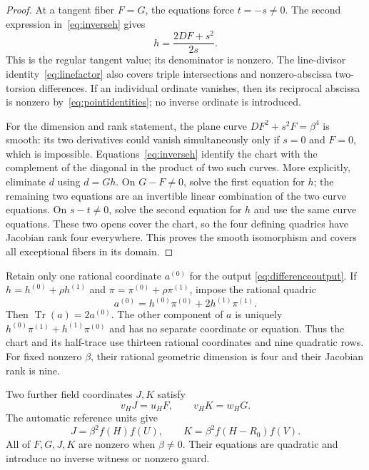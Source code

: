 \documentclass[11pt,a4paper]{article}
\DeclareMathOperator{\Tr}{Tr}\DeclareMathOperator{\Nm}{Nm}
\begin{document}
\begin{proof}
At a tangent fiber $F=G$, the equations force $t=-s\ne0$.
The second expression in~\eqref{eq:inverseh} gives
\[
                         h=\frac{2DF+s^2}{2s}.
\]
This is the regular tangent value; its denominator is nonzero.
The line-divisor identity~\eqref{eq:linefactor} also covers triple
intersections and nonzero-abscissa two-torsion differences. If an
individual ordinate vanishes, then its reciprocal abscissa is nonzero
by~\eqref{eq:pointidentities}; no inverse ordinate is introduced.

For the dimension and rank statement, the plane curve
$DF^2+s^2F=\beta^4$ is smooth: its two derivatives could vanish
simultaneously only if $s=0$ and $F=0$, which is impossible.
Equations~\eqref{eq:inverseh} identify the chart with the complement
of the diagonal in the product of two such curves. More explicitly,
eliminate $d$ using $d=Gh$. On $G-F\ne0$, solve the first equation
for $h$; the remaining two equations are an invertible linear
combination of the two curve equations. On $s-t\ne0$, solve the
second equation for $h$ and use the same curve equations. These two
opens cover the chart, so the four defining quadrics have Jacobian
rank four everywhere. This proves the smooth isomorphism and covers
all exceptional fibers in its domain.
\end{proof}

Retain only one rational coordinate $a^{(0)}$ for the output
\eqref{eq:differenceoutput}. If $h=h^{(0)}+\rho h^{(1)}$ and
$\pi=\pi^{(0)}+\rho\pi^{(1)}$, impose the rational quadric
\begin{equation}\label{eq:halftrace}
               a^{(0)}=h^{(0)}\pi^{(0)}+2h^{(1)}\pi^{(1)}.
\end{equation}
Then $\Tr(a)=2a^{(0)}$. The other component of $a$ is uniquely
$h^{(0)}\pi^{(1)}+h^{(1)}\pi^{(0)}$ and has no separate coordinate
or equation. Thus the chart and its half-trace use thirteen rational
coordinates and nine quadratic rows. For fixed nonzero $\beta$,
their rational geometric dimension is four and their Jacobian rank
is nine.

Two further field coordinates $J,K$ satisfy
\begin{equation}\label{eq:helpers}
                  v_HJ=u_HF,\qquad v_HK=w_HG.
\end{equation}
The automatic reference units give
\begin{equation}\label{eq:helpervalues}
 J=\beta^2f(H)f(U),\qquad K=\beta^2f(H-R_0)f(V).
\end{equation}
All of $F,G,J,K$ are nonzero when $\beta\ne0$. Their equations
are quadratic and introduce no inverse witness or nonzero guard.
\end{document}
